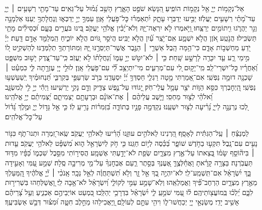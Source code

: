 \documentclass[twoside, openany, parskip=half, 11pt]{book}
\begin{document}
{
\begin{narrow}
%
אֵל־נְקָמ֥וֹת יְיָ֑ אֵ֖ל נְקָמ֣וֹת הוֹפִֽיעַ׃
הִ֭נָּשֵׂא שֹׁפֵ֣ט הָאָ֑רֶץ הָשֵׁ֥ב גְּ֝מ֗וּל עַל־גֵּאִֽים׃
עַד־מָתַ֖י רְשָׁעִ֥ים ׀ יְיָ֑ עַד־מָ֝תַ֗י רְשָׁעִ֥ים יַעֲלֹֽזוּ׃
יַבִּ֣יעוּ יְדַבְּר֣וּ עָתָ֑ק יִ֝תְאַמְּר֗וּ כׇּל־פֹּ֥עֲלֵי אָֽוֶן׃
עַמְּךָ֣ יְיָ֣ יְדַכְּא֑וּ וְֽנַחֲלָתְךָ֥ יְעַנּֽוּ׃
אַלְמָנָ֣ה וְגֵ֣ר יַהֲרֹ֑גוּ וִ֖יתוֹמִ֣ים יְרַצֵּֽחוּ׃
וַ֭יֹּ֣אמְרוּ לֹ֣א יִרְאֶה־יָּ֑הּ וְלֹא־יָ֝בִ֗ין אֱלֹהֵ֥י יַעֲקֹֽב׃
בִּ֭ינוּ בֹּעֲרִ֣ים בָּעָ֑ם וּ֝כְסִילִ֗ים מָתַ֥י תַּשְׂכִּֽילוּ׃
הֲנֹ֣טַֽע אֹ֭זֶן הֲלֹ֣א יִשְׁמָ֑ע אִֽם־יֹ֥צֵֽר עַ֗֝יִן הֲלֹ֣א יַבִּֽיט׃
הֲיֹסֵ֣ר גּ֭וֹיִם הֲלֹ֣א יוֹכִ֑יחַ הַֽמְלַמֵּ֖ד אָדָ֣ם דָּֽעַת׃
יְיָ֗ יֹ֭דֵעַ מַחְשְׁב֣וֹת אָדָ֑ם כִּי־הֵ֥מָּה הָֽבֶל׃
אַשְׁרֵ֤י ׀ הַגֶּ֣בֶר אֲשֶׁר־תְּיַסְּרֶ֣נּוּ יָּ֑הּ וּֽמִתּוֹרָתְךָ֥ תְלַמְּדֶֽנּוּ׃
לְהַשְׁקִ֣יט ל֭וֹ מִ֣ימֵי רָ֑ע עַ֤ד יִכָּרֶ֖ה לָרָשָׁ֣ע שָֽׁחַת׃
כִּ֤י ׀ לֹא־יִטֹּ֣שׁ יְיָ֣ עַמּ֑וֹ וְ֝נַחֲלָת֗וֹ לֹ֣א יַעֲזֹֽב׃
כִּֽי־עַד־צֶ֭דֶק יָשׁ֣וּב מִשְׁפָּ֑ט וְ֝אַחֲרָ֗יו כׇּל־יִשְׁרֵי־לֵֽב׃
מִֽי־יָק֣וּם לִ֭י עִם־מְרֵעִ֑ים מִי־יִתְיַצֵּ֥ב לִ֗֝י עִם־פֹּ֥עֲלֵי אָֽוֶן׃
לוּלֵ֣י יְיָ֭ עֶזְרָ֣תָה לִּ֑י כִּמְעַ֓ט ׀ שָׁכְנָ֖ה דוּמָ֣ה נַפְשִֽׁי׃
אִם־אָ֭מַרְתִּי מָ֣טָה רַגְלִ֑י חַסְדְּךָ֥ יְ֝יָ֗ יִסְעָדֵֽנִי׃
בְּרֹ֣ב שַׂרְעַפַּ֣י בְּקִרְבִּ֑י תַּ֝נְחוּמֶ֗יךָ יְֽשַׁעַשְׁע֥וּ נַפְשִֽׁי׃
הַֽ֭יְחׇבְרְךָ כִּסֵּ֣א הַוּ֑וֹת יֹצֵ֖ר עָמָ֣ל עֲלֵי־חֹֽק׃
יָ֭גוֹדּוּ עַל־נֶ֣פֶשׁ צַדִּ֑יק וְדָ֖ם נָקִ֣י יַרְשִֽׁיעוּ׃
וַיְהִ֬י יְיָ֣ לִ֣י לְמִשְׂגָּ֑ב וֵ֝אלֹהַ֗י לְצ֣וּר מַחְסִֽי׃
וַיָּ֤שֶׁב עֲלֵיהֶ֨ם ׀ אֶת־אוֹנָ֗ם וּבְרָעָתָ֥ם יַצְמִיתֵ֑ם יַ֝צְמִיתֵ֗ם יְיָ֥ אֱלֹהֵֽינוּ׃\\
%
לְ֭כוּ נְרַנְּנָ֣ה לַייָ֑ נָ֝רִ֗יעָה לְצ֣וּר יִשְׁעֵֽנוּ׃
נְקַדְּמָ֣ה פָנָ֣יו בְּתוֹדָ֑ה בִּ֝זְמִר֗וֹת נָרִ֥יעַֽ לֽוֹ׃
כִּ֤י אֵ֣ל גָּד֣וֹל יְיָ֑ וּמֶ֥לֶךְ גָּ֝ד֗וֹל עַל־כׇּל־אֱלֹהִֽים׃
\end{narrow}

\begin{narrow}
%
לַמְנַצֵּ֬חַ ׀ עַֽל־הַגִּתִּ֬ית לְאָסָֽף׃
הַ֭רְנִינוּ לֵאלֹהִ֣ים עוּזֵּ֑נוּ הָ֝רִ֗יעוּ לֵאלֹהֵ֥י יַעֲקֹֽב׃
שְֽׂאוּ־זִ֭מְרָה וּתְנוּ־תֹ֑ף כִּנּ֖וֹר נָעִ֣ים עִם־נָֽבֶל׃
תִּקְע֣וּ בַחֹ֣דֶשׁ שׁוֹפָ֑ר בַּ֝כֵּ֗סֶה לְי֣וֹם חַגֵּֽנוּ׃
כִּ֤י חֹ֣ק לְיִשְׂרָאֵ֣ל ה֑וּא מִ֝שְׁפָּ֗ט לֵאלֹהֵ֥י יַעֲקֹֽב׃
עֵ֤דוּת ׀ בִּיה֘וֹסֵ֤ף שָׂמ֗וֹ בְּ֭צֵאתוֹ עַל־אֶ֣רֶץ מִצְרָ֑יִם שְׂפַ֖ת לֹא־יָדַ֣עְתִּי אֶשְׁמָֽע׃
הֲסִיר֣וֹתִי מִסֵּ֣בֶל שִׁכְמ֑וֹ כַּ֝פָּ֗יו מִדּ֥וּד תַּעֲבֹֽרְנָה׃
בַּצָּרָ֥ה קָרָ֗אתָ וָאֲחַ֫לְּצֶ֥ךָּ אֶ֭עֶנְךָ בְּסֵ֣תֶר רַ֑עַם אֶבְחׇנְךָ֨ עַל־מֵ֖י מְרִיבָ֣ה סֶֽלָה׃
שְׁמַ֣ע עַ֭מִּי וְאָעִ֣ידָה בָּ֑ךְ יִ֝שְׂרָאֵ֗ל אִם־תִּֽשְׁמַֽע־לִֽי׃
לֹא־יִהְיֶ֣ה בְ֭ךָ אֵ֣ל זָ֑ר וְלֹ֥א תִ֝שְׁתַּחֲוֶ֗ה לְאֵ֣ל נֵכָֽר׃
אָֽנֹכִ֨י ׀ יְ֘יָ֤ אֱלֹהֶ֗יךָ הַֽ֭מַּעַלְךָ מֵאֶ֣רֶץ מִצְרָ֑יִם הַרְחֶב־פִּ֗֝יךָ וַאֲמַלְאֵֽהוּ׃
וְלֹֽא־שָׁמַ֣ע עַמִּ֣י לְקוֹלִ֑י וְ֝יִשְׂרָאֵ֗ל לֹא־אָ֥בָה לִֽי׃
וָ֭אֲשַׁלְּחֵהוּ בִּשְׁרִיר֣וּת לִבָּ֑ם יֵ֝לְכ֗וּ בְּֽמוֹעֲצ֖וֹתֵיהֶֽם׃
ל֗וּ עַ֭מִּי שֹׁמֵ֣עַֽ לִ֑י יִ֝שְׂרָאֵ֗ל בִּדְרָכַ֥י יְהַלֵּֽכוּ׃
כִּ֭מְעַט אוֹיְבֵיהֶ֣ם אַכְנִ֑יעַ וְעַ֥ל צָ֝רֵיהֶ֗ם אָשִׁ֥יב יָדִֽי׃
מְשַׂנְאֵ֣י יְיָ֭ יְכַחֲשׁוּ־ל֑וֹ וִיהִ֖י עִתָּ֣ם לְעוֹלָֽם׃
וַֽ֭יַּאֲכִילֵהוּ מֵחֵ֣לֶב חִטָּ֑ה וּ֝מִצּ֗וּר דְּבַ֣שׁ אַשְׂבִּיעֶֽךָ׃
\end{narrow}

}
\end{document}
